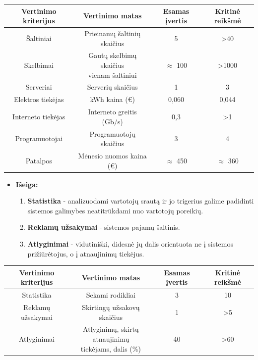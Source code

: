\documentclass[12pt]{article}
\begin{document}
	\begin{center}
		\begin{tabular}{ | c | c | c | c |}
			\hline
			Vertinimo kriterijus & Vertinimo matas & Esamas įvertis & Kritinė reikšmė \\ \hline 
			Šaltiniai & Prieinamų šaltinių skaičius & 5 & >40 \\ \hline
			Skelbimai & \makecell{Gautų skelbimų skaičius \\ vienam šaltiniui} & $\approx$ 100 & >1000\\ \hline
			Serveriai & Serverių skaičius & 1 & 3 \\ \hline
			Elektros tiekėjas & kWh kaina (€) & 0,060 & 0,044 \\ \hline
			Interneto tiekėjas & Interneto greitis (Gb/s) & 0,3 & >1 \\ \hline
			Programuotojai & Programuotojų skaičius & 3 & 4 \\ \hline
			Patalpos & Mėnesio nuomos kaina (€) & $\approx$ 450 & $\approx$ 360 \\ \hline
		\end{tabular}
	\end{center}

	\begin{itemize}
	\item{\textbf{Išeiga:}}
	\begin{enumerate}
		\item{\textbf{Statistika} - analizuodami vartotojų srautą ir jo trigerius galime padidinti sistemos galimybes neatitrūkdami nuo vartotojų poreikių.}
		\item{\textbf{Reklamų užsakymai} - sistemos pajamų šaltinis.}
		\item{\textbf{Atlyginimai} - vidutiniški, didesnė jų dalis orientuota ne į sistemos prižiūrėtojus, o į atnaujinimų tiekėjus.}
	\end{enumerate}
	\end{itemize}
	
	\begin{center}
		\begin{tabular}{ | c | c | c | c |}
			\hline
			Vertinimo kriterijus & Vertinimo matas & Esamas įvertis & Kritinė reikšmė \\ \hline 
			Statistika & Sekami rodikliai & 3 & 10 \\ \hline
			Reklamų užsakymai & Skirtingų užsakovų skaičius & 1 & >5 \\ \hline
			Atlyginimai & \makecell{Atlyginimų, skirtų atnaujinimų \\ tiekėjams, dalis (\%)} & 40 & >60 \\ \hline
		\end{tabular}
	\end{center} 
\end{document}
